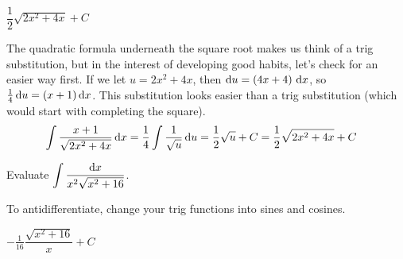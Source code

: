 \begin{answer}
$\dfrac{1}{2}\sqrt{2x^2+4x}+C$
\end{answer}
\begin{solution}
The quadratic formula underneath the square root makes us think of a trig substitution, but in the interest of developing good habits, let's check for an easier way first. If we let $u=2x^2+4x$, then $\mathrm{d}u = (4x+4)~\mathrm{d}x$, so $\frac{1}{4}\,\mathrm{d}u=(x+1)\,\mathrm{d}x$. This substitution looks easier than a trig substitution (which would start with completing the square).
\begin{align*}
\int\frac{x+1}{\sqrt{2x^2+4x}}
\, \mathrm{d}x&=\frac{1}{4}\int \frac{1}{\sqrt{u}}\,\mathrm{d}u = \frac{1}{2}\sqrt{u}+C = \frac{1}{2}\sqrt{2x^2+4x}+C
\end{align*}

\end{solution}



\begin{question}[2014D]
Evaluate $\displaystyle\int\frac{\mathrm{d}x}{x^2\sqrt{x^2+16}}$.
\end{question}

\begin{hint} 
To antidifferentiate, change your trig functions into sines and cosines.
\end{hint}

\begin{answer} 
$-\displaystyle\frac{1}{16}\dfrac{\sqrt{x^2+16}}{x}+C$
\end{answer}

